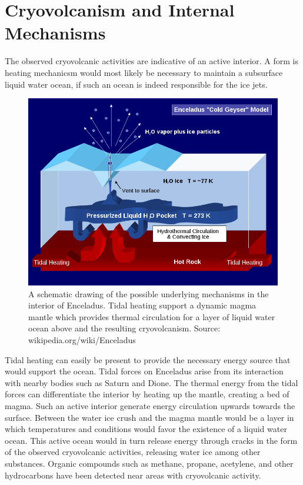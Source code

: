 \documentclass{article}
\begin{document}
\section{Cryovolcanism and Internal Mechanisms}
The observed cryovolcanic activities are indicative of an active
interior. A form is heating mechanicsm would most likely be necessary to
maintain a subsurface liquid water ocean, if such an ocean is indeed
responsible for the ice jets.
\begin{figure}[h]
\centering
\includegraphics[width=.7\textwidth]{enceladus_heating.png}
\caption{A schematic drawing of the possible underlying mechanisms in
  the interior of Enceladus. Tidal heating support a dynamic magma
  mantle which provides thermal circulation for a layer of liquid water
  ocean above and the resulting cryovolcanism. 
  Source: wikipedia.org/wiki/Enceladus}
\end{figure}
Tidal heating can easily be present to provide the necessary energy
source that would support the ocean. Tidal forces on Enceladus arise
from its interaction with nearby bodies such as Saturn and Dione. The
thermal energy from the tidal forces can differentiate the interior by
heating up the mantle, creating a bed of magma. Such an active interior
generate energy circulation upwards towards the surface. Between the
water ice crush and the magma mantle would be a layer in which
temperatures and conditions would favor the existence of a liquid water
ocean. This active ocean would in turn release energy through cracks in
the form of the observed cryovolcanic activities, releasing water ice
among other substances. Organic compounds such as methane, propane,
acetylene, and other hydrocarbons have been detected near areas with
cryovolcanic activity.
\end{document}
